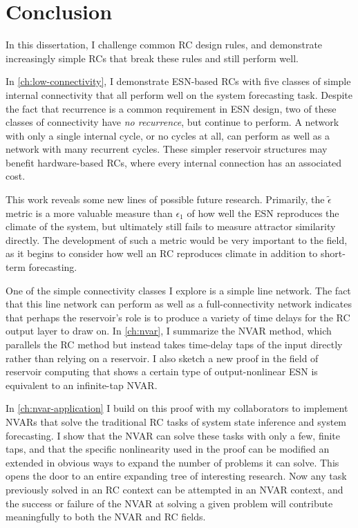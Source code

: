 \chapter{Conclusion}\label{ch:conclusion}

In this dissertation, I challenge common RC design rules, and
demonstrate increasingly simple RCs that break these rules and still
perform well.

In \cref{ch:low-connectivity}, I demonstrate ESN-based RCs with five
classes of simple internal connectivity that all perform well on the
system forecasting task. Despite the fact that recurrence is a common
requirement in ESN design, two of these classes of connectivity have
\emph{no recurrence}, but continue to perform. A network with only a
single internal cycle, or no cycles at all, can perform as well as a
network with many recurrent cycles. These simpler reservoir structures
may benefit hardware-based RCs, where every internal connection has an
associated cost.

This work reveals some new lines of possible future
research. Primarily, the $\tilde{\epsilon}$ metric is a more valuable
measure than $\epsilon_1$ of how well the ESN reproduces the climate
of the system, but ultimately still fails to measure attractor
similarity directly. The development of such a metric would be very
important to the field, as it begins to consider how well an RC
reproduces climate in addition to short-term forecasting.

One of the simple connectivity classes I explore is a simple line
network. The fact that this line network can perform as well as a
full-connectivity network indicates that perhaps the reservoir's role
is to produce a variety of time delays for the RC output layer to draw
on. In \cref{ch:nvar}, I summarize the NVAR method, which parallels
the RC method but instead takes time-delay taps of the input directly
rather than relying on a reservoir. I also sketch a new proof in the
field of reservoir computing that shows a certain type of
output-nonlinear ESN is equivalent to an infinite-tap NVAR.

In \cref{ch:nvar-application} I build on this proof with my
collaborators to implement NVARs that solve the traditional RC tasks
of system state inference and system forecasting. I show
that the NVAR can solve these tasks with only a few, finite taps, and
that the specific nonlinearity used in the proof can be modified an
extended in obvious ways to expand the number of problems it can
solve. This opens the door to an entire expanding tree of interesting
research. Now any task previously solved in an RC context can be
attempted in an NVAR context, and the success or failure of the NVAR
at solving a given problem will contribute meaningfully to both the
NVAR and RC fields.

